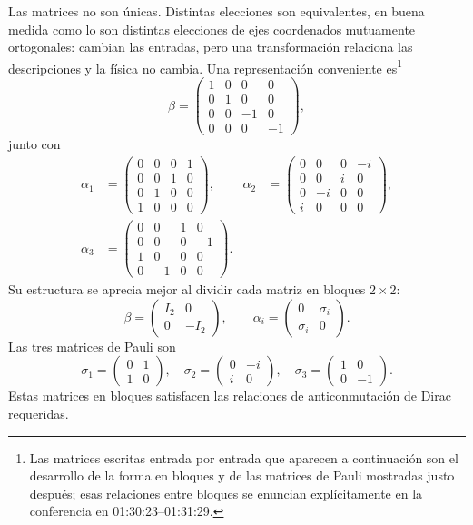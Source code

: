Las matrices no son únicas. Distintas elecciones son equivalentes, en buena medida como lo son distintas elecciones de ejes coordenados mutuamente ortogonales: cambian las entradas, pero una transformación relaciona las descripciones y la física no cambia. Una representación conveniente es\footnote{Las matrices escritas entrada por entrada que aparecen a continuación son el desarrollo de la forma en bloques y de las matrices de Pauli mostradas justo después; esas relaciones entre bloques se enuncian explícitamente en la conferencia en 01:30:23--01:31:29.}
\begin{equation}
\beta=
\begin{pmatrix}
1&0&0&0\\
0&1&0&0\\
0&0&-1&0\\
0&0&0&-1
\end{pmatrix},
\end{equation}
junto con
\begin{align}
\alpha_1&=
\begin{pmatrix}
0&0&0&1\\
0&0&1&0\\
0&1&0&0\\
1&0&0&0
\end{pmatrix},
&
\alpha_2&=
\begin{pmatrix}
0&0&0&-i\\
0&0&i&0\\
0&-i&0&0\\
i&0&0&0
\end{pmatrix},
\\[1ex]
\alpha_3&=
\begin{pmatrix}
0&0&1&0\\
0&0&0&-1\\
1&0&0&0\\
0&-1&0&0
\end{pmatrix}.
\end{align}
Su estructura se aprecia mejor al dividir cada matriz en bloques \(2\times2\):
\begin{equation}
\beta=
\begin{pmatrix}
I_2&0\\
0&-I_2
\end{pmatrix},
\qquad
\alpha_i=
\begin{pmatrix}
0&\sigma_i\\
\sigma_i&0
\end{pmatrix}.
\end{equation}
Las tres matrices de Pauli son
\begin{equation}
\sigma_1=
\begin{pmatrix}
0&1\\
1&0
\end{pmatrix},
\quad
\sigma_2=
\begin{pmatrix}
0&-i\\
i&0
\end{pmatrix},
\quad
\sigma_3=
\begin{pmatrix}
1&0\\
0&-1
\end{pmatrix}.
\end{equation}
Estas matrices en bloques satisfacen las relaciones de anticonmutación de Dirac requeridas.

